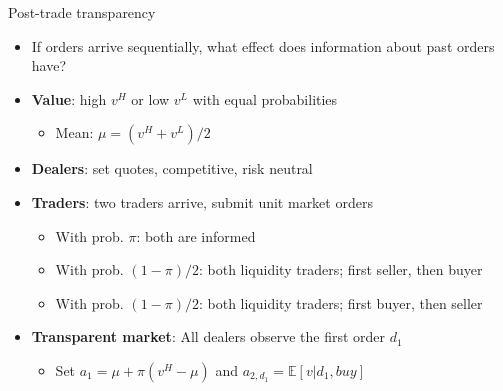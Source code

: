 \documentclass[english,10pt
,aspectratio=169
]{beamer}
\begin{document}
\begin{frame}{Post-trade transparency}
	\begin{itemize}
		\item If orders arrive sequentially, what effect does information about \alert{past orders} have?
		\item \textbf{Value}: high $v^H$ or low $v^L$ with equal probabilities
		\begin{itemize}
			\item Mean: $\mu=(v^H+v^L)/2$
		\end{itemize}
		\item \textbf{Dealers}: set quotes, competitive, risk neutral
		\item \textbf{Traders}: two traders arrive, submit unit market orders
		\begin{itemize}
			\item With prob. $\pi$: both are informed
			\item With prob. $(1-\pi)/2$: both liquidity traders;  first  seller, then buyer
			\item With prob. $(1-\pi)/2$: both liquidity traders;  first  buyer, then seller
		\end{itemize}
		\item \textbf{Transparent market}: All dealers observe the first order $d_1$
		\begin{itemize}
			\item Set $a_1=\mu+\pi(v^{H}-\mu)$ and $a_{2,d_1}=\mathbb{E}[v|d_1,buy]$
		\end{itemize}
	\end{itemize}
\end{frame}
\end{document}
